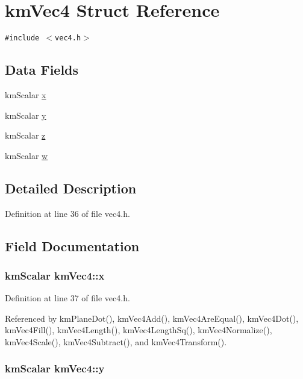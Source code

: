 \hypertarget{structkm_vec4}{
\section{kmVec4 Struct Reference}
\label{structkm_vec4}
}
{\tt \#include $<$vec4.h$>$}

\subsection*{Data Fields}
\begin{CompactItemize}
\item 
kmScalar \hyperlink{structkm_vec4_2f05daa4b1ff4cdb6f5340d0ff28c6ac}{x}
\item 
kmScalar \hyperlink{structkm_vec4_166ea934d56eca30a97b190d365b62b8}{y}
\item 
kmScalar \hyperlink{structkm_vec4_f4e022632723b68a304ac40d308cceab}{z}
\item 
kmScalar \hyperlink{structkm_vec4_b002db65c3793806ec266f2cc348879f}{w}
\end{CompactItemize}


\subsection{Detailed Description}


Definition at line 36 of file vec4.h.

\subsection{Field Documentation}
\hypertarget{structkm_vec4_2f05daa4b1ff4cdb6f5340d0ff28c6ac}{
\subsubsection[x]{\setlength{\rightskip}{0pt plus 5cm}kmScalar {\bf kmVec4::x}}}
\label{structkm_vec4_2f05daa4b1ff4cdb6f5340d0ff28c6ac}




Definition at line 37 of file vec4.h.

Referenced by kmPlaneDot(), kmVec4Add(), kmVec4AreEqual(), kmVec4Dot(), kmVec4Fill(), kmVec4Length(), kmVec4LengthSq(), kmVec4Normalize(), kmVec4Scale(), kmVec4Subtract(), and kmVec4Transform().\hypertarget{structkm_vec4_166ea934d56eca30a97b190d365b62b8}{
\subsubsection[y]{\setlength{\rightskip}{0pt plus 5cm}kmScalar {\bf kmVec4::y}}}
\label{structkm_vec4_166ea934d56eca30a97b190d365b62b8}




